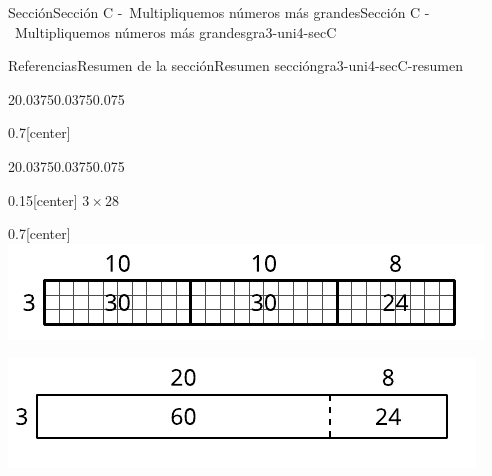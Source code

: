 \documentclass[twoside,10pt,]{article}
\begin{document}
\begin{sectionptx}{Sección}{Sección C -~Multipliquemos números más grandes}{}{Sección C -~Multipliquemos números más grandes}{}{}{gra3-uni4-secC}
\begin{references-subsection}{Referencias}{Resumen de la sección}{}{Resumen sección}{}{}{gra3-uni4-secC-resumen}
\begin{sidebyside}{2}{0.0375}{0.0375}{0.075}
\begin{sbspanel}{0.7}[center]
\end{sbspanel}%
\end{sidebyside}%
\begin{sidebyside}{2}{0.0375}{0.0375}{0.075}%
\begin{sbspanel}{0.15}[center]%
\(3\times 28\)%
\end{sbspanel}%
\begin{sbspanel}{0.7}[center]%
\includegraphics[width=\linewidth]{external/svg-source/tikz-file-141827-scale13.pdf}
\par
\includegraphics[width=\linewidth]{external/svg-source/tikz-file-158683-scale13.pdf}
\end{sbspanel}%
\end{sidebyside}%
\end{references-subsection}
\end{sectionptx}
%
%
\typeout{************************************************}
\typeout{************************************************}
%
\end{document}
